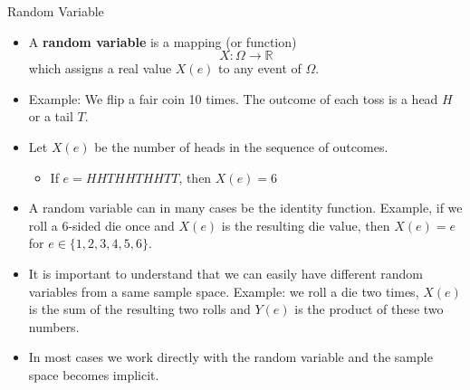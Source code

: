 \documentclass[handout]{beamer}
\begin{document}
\begin{frame}{Random Variable}
\scriptsize{

\begin{itemize}
 \item A \textbf{random variable} is a mapping (or function)
\begin{displaymath}
 X: \Omega \rightarrow \mathbb{R}
\end{displaymath}
which assigns a real value $X(e)$ to any event of $\Omega$.


\item Example: We flip a fair coin 10 times. The outcome of each toss is a head $H$ or a tail $T$.

\item  Let $X(e)$ be the number of heads in the sequence of outcomes.
\begin{itemize}
 \item If $e=HHTHHTHHTT$, then $X(e)=6$ 
\end{itemize}


\item A random variable can in many cases be the identity function. Example, if we roll a 6-sided die once and $X(e)$ is the resulting die value, then $X(e)=e$ for $e \in \{1,2,3,4,5,6\}$.   

\item  It is important to understand that we can easily have different random variables from a same sample space. Example: we roll a die two times, $X(e)$ is the sum of the resulting two rolls and $Y(e)$ is the product of these two numbers.

\item In most cases we work directly with the random variable and the sample space becomes implicit.


\end{itemize}


}

\end{frame}
\end{document}
